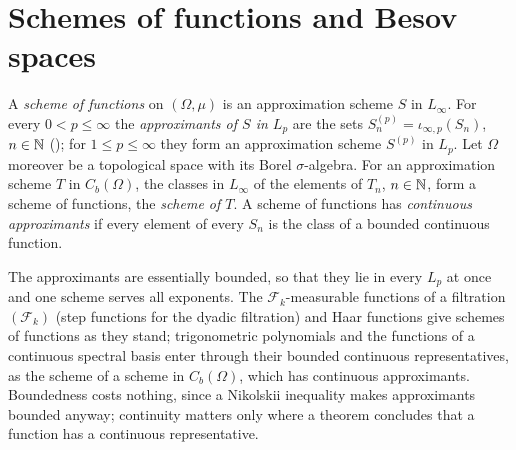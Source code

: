 \section{Schemes of functions and Besov spaces}

\begin{definition}
\label{def:function-scheme}
\leanok
{}
A \emph{scheme of functions} on $(\Omega, \mu)$ is an approximation scheme $S$ in $L_\infty$.
For every $0 < p \leq \infty$ the \emph{approximants of $S$ in $L_p$} are the sets
$S^{(p)}_n = \iota_{\infty,p}(S_n)$, $n \in \mathbb{N}$ (); for
$1 \leq p \leq \infty$ they form an approximation scheme $S^{(p)}$ in $L_p$. Let $\Omega$
moreover be a topological space with its Borel $\sigma$-algebra. For an approximation scheme $T$
in $C_b(\Omega)$, the classes in $L_\infty$ of the elements of $T_n$, $n \in \mathbb{N}$, form a scheme
of functions, the \emph{scheme of $T$}. A scheme of functions has \emph{continuous approximants}
if every element of every $S_n$ is the class of a bounded continuous function.
\end{definition}

The approximants are essentially bounded, so that they lie in every $L_p$ at once and one scheme
serves all exponents. The $\mathcal{F}_k$-measurable functions of a filtration
$(\mathcal{F}_k)$ (step functions for the dyadic filtration) and Haar functions give schemes of
functions as they stand; trigonometric polynomials and the functions of a continuous spectral
basis enter through their bounded continuous representatives, as the scheme of a scheme in
$C_b(\Omega)$, which has continuous approximants. Boundedness costs nothing, since a Nikolskii
inequality makes approximants bounded anyway; continuity matters only where a theorem concludes
that a function has a continuous representative.

